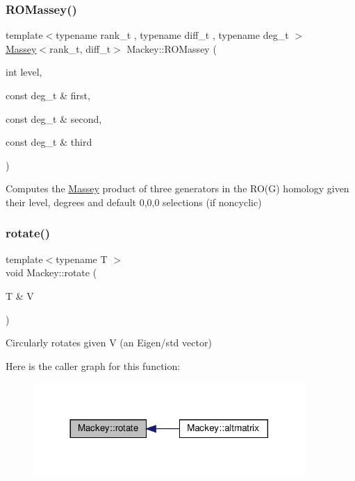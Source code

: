 \subsubsection{\texorpdfstring{R\+O\+Massey()}{ROMassey()}\hspace{0.1cm}{\footnotesize\ttfamily [2/2]}}
{\footnotesize\ttfamily template$<$typename rank\+\_\+t , typename diff\+\_\+t , typename deg\+\_\+t $>$ \\
\hyperlink{classMackey_1_1Massey}{Massey}$<$rank\+\_\+t, diff\+\_\+t$>$ Mackey\+::\+R\+O\+Massey (\begin{DoxyParamCaption}\item[{int}]{level,  }\item[{const deg\+\_\+t \&}]{first,  }\item[{const deg\+\_\+t \&}]{second,  }\item[{const deg\+\_\+t \&}]{third }\end{DoxyParamCaption})\hspace{0.3cm}{\ttfamily [inline]}}



Computes the \hyperlink{classMackey_1_1Massey}{Massey} product of three generators in the R\+O(\+G) homology given their level, degrees and default 0,0,0 selections (if noncyclic) 

\mbox{\label{namespaceMackey_a38a833de54971845cbdb8c96f830725b}} 
\subsubsection{\texorpdfstring{rotate()}{rotate()}}
{\footnotesize\ttfamily template$<$typename T $>$ \\
void Mackey\+::rotate (\begin{DoxyParamCaption}\item[{T \&}]{V }\end{DoxyParamCaption})}



Circularly rotates given V (an Eigen/std vector) 

Here is the caller graph for this function\+:\nopagebreak
\begin{figure}[H]
\begin{center}
\leavevmode
\includegraphics[width=293pt]{namespaceMackey_a38a833de54971845cbdb8c96f830725b_icgraph}
\end{center}
\end{figure}
\mbox{\label{namespaceMackey_aab8a6292210a3b71960cb03b79d218e6}} 

